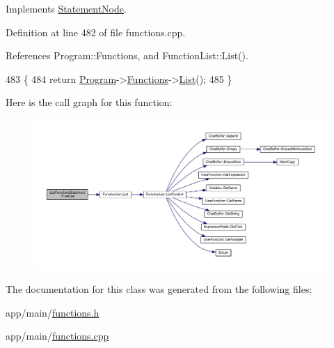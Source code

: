 Implements \hyperlink{classStatementNode_a721589622c930c010927b9a9c55b173e}{Statement\+Node}.



Definition at line 482 of file functions.\+cpp.



References Program\+::\+Functions, and Function\+List\+::\+List().


\begin{DoxyCode}
483 \{
484     \textcolor{keywordflow}{return} \hyperlink{classProgram}{Program}->\hyperlink{classProgram_ac643877adc06800a021263b2234cd236}{Functions}->\hyperlink{classFunctionList_a667bf5683f0b7332b5607781df53c728}{List}();
485 \}
\end{DoxyCode}


Here is the call graph for this function\+:\nopagebreak
\begin{figure}[H]
\begin{center}
\leavevmode
\includegraphics[width=350pt]{classListFunctionsStatement_aecbd17235ded16103ebed33a8fcca90e_cgraph}
\end{center}
\end{figure}




The documentation for this class was generated from the following files\+:\begin{DoxyCompactItemize}
\item 
app/main/\hyperlink{functions_8h}{functions.\+h}\item 
app/main/\hyperlink{functions_8cpp}{functions.\+cpp}\end{DoxyCompactItemize}
